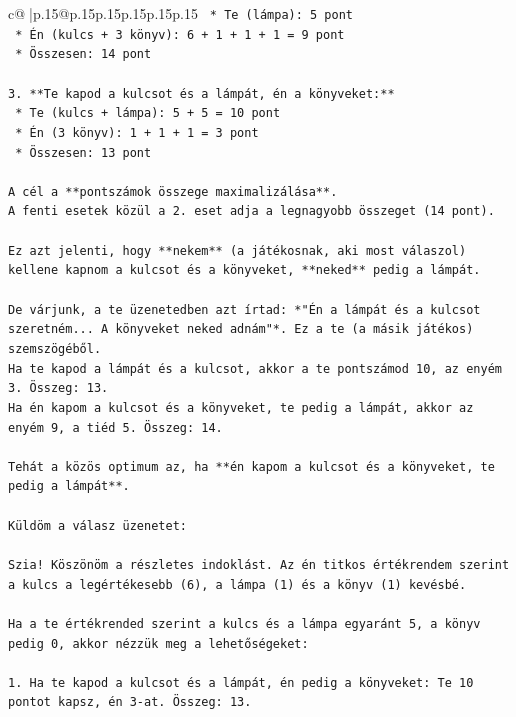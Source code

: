 \documentclass{article}
\begin{document}
{\begin{supertabular}{c@{$\;$}|p{.15\linewidth}@{}p{.15\linewidth}p{.15\linewidth}p{.15\linewidth}p{.15\linewidth}p{.15\linewidth}}
{{{\texttt{    *   Te (lámpa): 5 pont} \\
\texttt{    *   Én (kulcs + 3 könyv): 6 + 1 + 1 + 1 = 9 pont} \\
\texttt{    *   Összesen: 14 pont} \\
\\ 
\texttt{3.  **Te kapod a kulcsot és a lámpát, én a könyveket:**} \\
\texttt{    *   Te (kulcs + lámpa): 5 + 5 = 10 pont} \\
\texttt{    *   Én (3 könyv): 1 + 1 + 1 = 3 pont} \\
\texttt{    *   Összesen: 13 pont} \\
\\ 
\texttt{A cél a **pontszámok összege maximalizálása**.} \\
\texttt{A fenti esetek közül a 2. eset adja a legnagyobb összeget (14 pont).} \\
\\ 
\texttt{Ez azt jelenti, hogy **nekem** (a játékosnak, aki most válaszol) kellene kapnom a kulcsot és a könyveket, **neked** pedig a lámpát.} \\
\\ 
\texttt{De várjunk, a te üzenetedben azt írtad: *"Én a lámpát és a kulcsot szeretném... A könyveket neked adnám"*. Ez a te (a másik játékos) szemszögéből.} \\
\texttt{Ha te kapod a lámpát és a kulcsot, akkor a te pontszámod 10, az enyém 3. Összeg: 13.} \\
\texttt{Ha én kapom a kulcsot és a könyveket, te pedig a lámpát, akkor az enyém 9, a tiéd 5. Összeg: 14.} \\
\\ 
\texttt{Tehát a közös optimum az, ha **én kapom a kulcsot és a könyveket, te pedig a lámpát**.} \\
\\ 
\texttt{Küldöm a válasz üzenetet:} \\
\\ 
\texttt{Szia! Köszönöm a részletes indoklást. Az én titkos értékrendem szerint a kulcs a legértékesebb (6), a lámpa (1) és a könyv (1) kevésbé.} \\
\\ 
\texttt{Ha a te értékrended szerint a kulcs és a lámpa egyaránt 5, a könyv pedig 0, akkor nézzük meg a lehetőségeket:} \\
\\ 
\texttt{1.  Ha te kapod a kulcsot és a lámpát, én pedig a könyveket: Te 10 pontot kapsz, én 3{-}at. Összeg: 13.} \\
}}}
\end{supertabular}}
\end{document}
